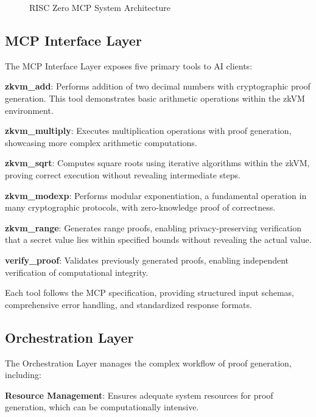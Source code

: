 \documentclass[11pt]{article}
\begin{document}
\begin{figure}[ht]
\centering
\caption{RISC Zero MCP System Architecture}
\label{fig:architecture}
\end{figure}

\subsection{MCP Interface Layer}

The MCP Interface Layer exposes five primary tools to AI clients:

\textbf{zkvm\_add}: Performs addition of two decimal numbers with cryptographic proof generation. This tool demonstrates basic arithmetic operations within the zkVM environment.

\textbf{zkvm\_multiply}: Executes multiplication operations with proof generation, showcasing more complex arithmetic computations.

\textbf{zkvm\_sqrt}: Computes square roots using iterative algorithms within the zkVM, proving correct execution without revealing intermediate steps.

\textbf{zkvm\_modexp}: Performs modular exponentiation, a fundamental operation in many cryptographic protocols, with zero-knowledge proof of correctness.

\textbf{zkvm\_range}: Generates range proofs, enabling privacy-preserving verification that a secret value lies within specified bounds without revealing the actual value.

\textbf{verify\_proof}: Validates previously generated proofs, enabling independent verification of computational integrity.

Each tool follows the MCP specification, providing structured input schemas, comprehensive error handling, and standardized response formats.

\subsection{Orchestration Layer}

The Orchestration Layer manages the complex workflow of proof generation, including:

\textbf{Resource Management}: Ensures adequate system resources for proof generation, which can be computationally intensive.
\end{document}
